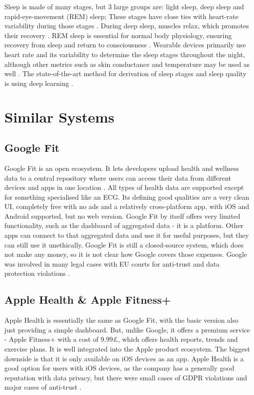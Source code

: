Sleep is made of many stages, but 3 large groups are: light sleep, deep sleep and rapid-eye-movement (REM) sleep; These stages have close ties with heart-rate variability during those stages \cite{sleepDef}. During deep sleep, muscles relax, which promotes their recovery \cite{Jung2010Energy}. REM sleep is essential for normal body physiology, ensuring recovery from sleep and return to consciousness \cite{VERTES1986371}. Wearable devices primarily use heart rate and its variability to determine the sleep stages throughout the night, although other metrics such as skin conductance and temperature may be used as well \cite{Zambotti2019Wearable}. The state-of-the-art method for derivation of sleep stages and sleep quality is using deep learning \cite{Sathyanarayana2016Sleep}.

\section{Similar Systems}
\label{section:similarSystems}
\subsection{Google Fit}
Google Fit is an open ecosystem. It lets developers upload health and wellness data to a central repository where users can access their data from different devices and apps in one location \cite{googleFit}. All types of health data are supported except for something specialised like an ECG. Its defining good qualities are a very clean UI, completely free with no ads and a relatively cross-platform app, with iOS and Android supported, but no web version.  Google Fit by itself offers very limited functionality, such as the dashboard of aggregated data - it is a platform. Other apps can connect to that aggregated data and use it for useful purposes, but they can still use it unethically. Google Fit is still a closed-source system, which does not make any money, so it is not clear how Google covers those expenses. Google was involved in many legal cases with EU courts for anti-trust \cite{googleAntiTrust} and data protection violations \cite{googleDataProtect, googleDataProtect2}.
\subsection{Apple Health \& Apple Fitness+}
Apple Health is essentially the same as Google Fit, with the basic version also just providing a simple dashboard. But, unlike Google, it offers a premium service - Apple Fitness+ with a cost of 9.99£, which offers health reports, trends and exercise plans. It is well integrated into the Apple product ecosystem. The biggest downside is that it is only available on iOS devices as an app. Apple Health is a good option for users with iOS devices, as the company has a generally good reputation with data privacy, but there were small cases of GDPR violations \cite{CNILApple} and major cases of anti-trust \cite{appleAntiTrust}.
